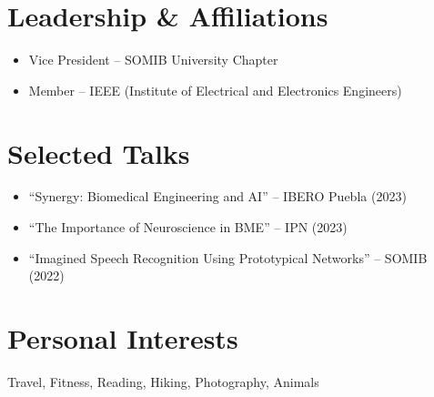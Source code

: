 \section*{Leadership \& Affiliations}
\begin{itemize}
  \item Vice President – SOMIB University Chapter
  \item Member – IEEE (Institute of Electrical and Electronics Engineers)
\end{itemize}

\section*{Selected Talks}
\begin{itemize}
  \item “Synergy: Biomedical Engineering and AI” – IBERO Puebla (2023)
  \item “The Importance of Neuroscience in BME” – IPN (2023)
  \item “Imagined Speech Recognition Using Prototypical Networks” – SOMIB (2022)
\end{itemize}


\section*{Personal Interests}

Travel, Fitness, Reading, Hiking, Photography, Animals